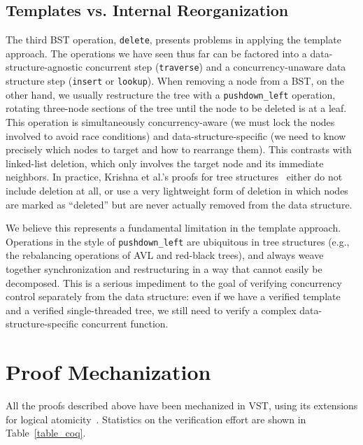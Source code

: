\documentclass[a4paper,UKenglish,cleveref, autoref, thm-restate]{lipics-v2021}
\begin{document}
\subsection{Templates vs. Internal Reorganization}
\label{internal_reorganize}
The third BST operation, \lstinline{delete}, presents problems in applying the template approach. The operations we have seen thus far can be factored into a data-structure-agnostic concurrent step (\lstinline{traverse}) and a concurrency-unaware data structure step (\lstinline{insert} or \lstinline{lookup}). When removing a node from a BST, on the other hand, we usually restructure the tree with a \lstinline{pushdown_left} operation, %
rotating three-node sections of the tree until the node to be deleted is at a leaf. This operation is simultaneously concurrency-aware (we must lock the nodes involved to avoid race conditions) and data-structure-specific (we need to know precisely which nodes to target and how to rearrange them). This contrasts with linked-list deletion, which only involves the target node and its immediate neighbors. In practice, Krishna et al.'s proofs for tree structures~\cite{templates} either do not include deletion at all, or use a very lightweight form of deletion in which nodes are marked as ``deleted'' but are never actually removed from the data structure.

We believe this represents a fundamental limitation in the template approach. Operations in the style of \lstinline{pushdown_left} are ubiquitous in tree structures (e.g., the rebalancing operations of AVL and red-black trees), and always weave together synchronization and restructuring in a way that cannot easily be decomposed. This is a serious impediment to the goal of verifying concurrency control separately from the data structure: even if we have a verified template and a verified single-threaded tree, we still need to verify a complex data-structure-specific concurrent function. %

\section{Proof Mechanization}
\label{proof_mech}
All the proofs described above have been mechanized in VST, using its extensions for logical atomicity~\cite{iris-vst-arxiv}. Statistics on the verification effort are shown in Table~\ref{table_coq}.
\end{document}
